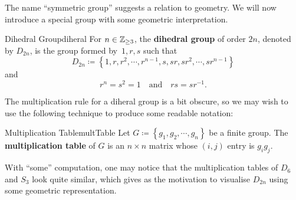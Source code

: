 \documentclass[math]{amznotes}
\theoremstyle{remark}
\newcommand{\0}{\mathbf{0}}
\newcommand{\1}{\mathbf{1}}
\begin{document}
The name ``symmetric group'' suggests a relation to geometry. We will now introduce a special group with some geometric interpretation.
\begin{dfnbox}{Dihedral Group}{diheral}
    For $n \in \mathbb{Z}_{\geq 3}$, the {\color{red} \textbf{dihedral group}} of order $2n$, denoted by $D_{2n}$, is the group formed by~$1, r, s$ such that 
    \begin{equation*}
        D_{2n} \coloneqq \left\{1, r, r^2, \cdots, r^{n - 1}, s, sr, sr^2, \cdots, sr^{n - 1}\right\}
    \end{equation*}
    and 
    \begin{equation*}
        r^n = s^2 = 1 \quad\text{and}\quad rs = sr^{-1}.
    \end{equation*}
\end{dfnbox}
The multiplication rule for a diheral group is a bit obscure, so we may wish to use the following technique to produce some readable notation:
\begin{dfnbox}{Multiplication Table}{multTable}
    Let $G \coloneqq \left\{g_1, g_2, \cdots, g_n\right\}$ be a finite group. The {\color{red} \textbf{multiplication table}} of $G$ is an $n \times n$ matrix whose $\left(i, j\right)$ entry is $g_ig_j$.
\end{dfnbox}
With ``some'' computation, one may notice that the multiplication tables of $D_{6}$ and $S_3$ look quite similar, which gives as the motivation to visualise $D_{2n}$ using some geometric representation.
\end{document}
